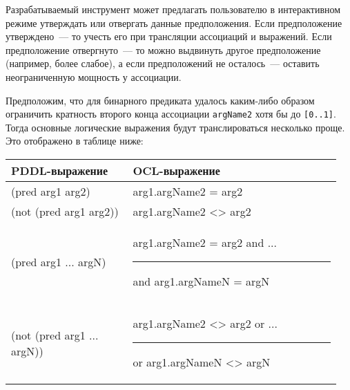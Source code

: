 Разрабатываемый инструмент может предлагать пользователю в интерактивном режиме утверждать или отвергать данные предположения.
Если предположение утверждено~--- то учесть его при трансляции ассоциаций и выражений. 
Если предположение отвергнуто~--- то можно выдвинуть другое предположение (например, более слабое), а если предположений не осталось~--- оставить неограниченную мощность у ассоциации.






Предположим, что для бинарного предиката удалось каким-либо образом ограничить кратность второго конца ассоциации \texttt{argName2} хотя бы до \texttt{[0..1]}. Тогда основные логические выражения будут транслироваться несколько проще. Это отображено в таблице ниже:
\\

{
    \renewcommand{\arraystretch}{1.3}
    \small
    \centering
    \ttfamily
    \begin{tabular}{|p{0.35\linewidth}|p{0.60\linewidth}|}
        \hline
        \normalfont\bfseries PDDL\:-выражение & \normalfont\bfseries OCL\:-выражение \\
        \hline
          (pred arg1 arg2) & arg1.argName2 = arg2 \\
        \hline
          (not (pred arg1 arg2)) & arg1.argName2 <> arg2\\
        \hline
          (pred arg1 ... argN) 
          & 
          arg1.argName2 = arg2 and ...\newline
          \rule{2em}{0em} and arg1.argNameN = argN \\
        \hline
          (not (pred arg1 ... argN))
          &
          arg1.argName2 <> arg2 or ...\newline
          \rule{2em}{0em} or arg1.argNameN <> argN \\
        \hline

    \end{tabular}
}
\\[5pt]





